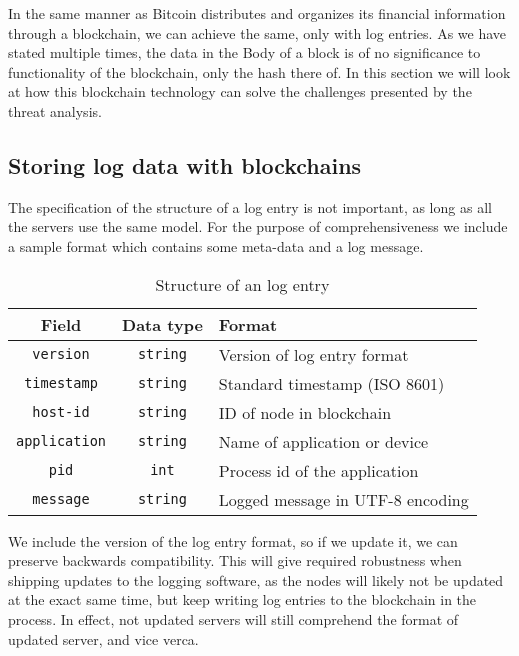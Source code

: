 
In the same manner as Bitcoin distributes and organizes its financial
information through a blockchain, we can achieve the same, only with
log entries. As we have stated multiple times, the data in the Body of
a block is of no significance to functionality of the blockchain, only
the hash there of. In this section we will look at how this blockchain
technology can solve the challenges presented by the threat analysis.


\subsection{Storing log data with blockchains}
The specification of the structure of a log entry is not important, as
long as all the servers use the same model. For the purpose of
comprehensiveness we include a sample format which contains some
meta-data and a log message.
\begin{table}[H]
  \centering
  \begin{tabular}{c|c|l}
    Field                & Data type       & Format                                    \\ \hline
    \texttt{version}     & \texttt{string} & Version of log entry format               \\
    \texttt{timestamp}   & \texttt{string} & Standard timestamp (ISO 8601)             \\
    \texttt{host-id}     & \texttt{string} & ID of node in blockchain                  \\
    \texttt{application} & \texttt{string} & Name of application or device             \\
    \texttt{pid}         & \texttt{int}    & Process id of the application             \\
    \texttt{message}     & \texttt{string} & Logged message in UTF-8 encoding
  \end{tabular}
  \caption{\label{tab:log-entry} Structure of an log entry}
\end{table}
We include the version of the log entry format, so if we update it, we
can preserve backwards compatibility. This will give required
robustness when shipping updates to the logging software, as the nodes
will likely not be updated at the exact same time, but keep writing
log entries to the blockchain in the process. In effect, not updated
servers will still comprehend the format of updated server, and vice
verca.

